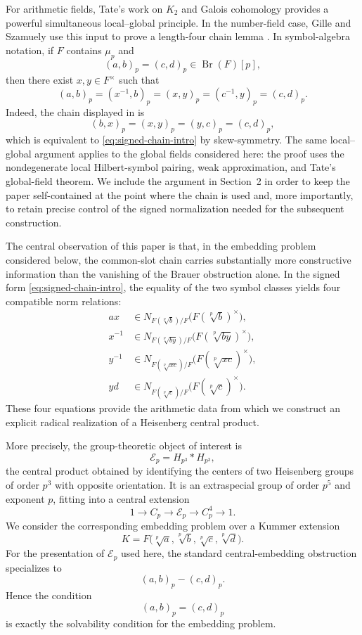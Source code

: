 \documentclass[12pt]{amsart}
\theoremstyle{definition}
\theoremstyle{remark}
\DeclareMathOperator{\Br}{Br}
\newcommand{\Hp}{H_{p^3}}
\newcommand{\E}{\mathcal E_p}
\begin{document}
For arithmetic fields, Tate's work on $K_2$ and Galois cohomology provides a
powerful simultaneous local--global principle. In the number-field case,
Gille and Szamuely use this input to prove a length-four chain lemma
\cite[Lemma~7.6.11]{GilleSzamuely}. In symbol-algebra notation, if $F$
contains $\mu_p$ and
\[(a,b)_p=(c,d)_p\in\Br(F)[p],\]
then there exist $x,y\in F^\times$ such that
\begin{equation}\label{eq:signed-chain-intro}
	(a,b)_p=(x^{-1},b)_p=(x,y)_p=(c^{-1},y)_p=(c,d)_p.
\end{equation}
Indeed, the chain displayed in \cite[Lemma~7.6.11]{GilleSzamuely} is
\[(b,x)_p=(x,y)_p=(y,c)_p=(c,d)_p,\]
which is equivalent to \eqref{eq:signed-chain-intro} by skew-symmetry. The
same local--global argument applies to the global fields considered here:
the proof uses the nondegenerate local Hilbert-symbol pairing, weak
approximation, and Tate's global-field theorem. We include the argument in
Section~2 in order to keep the paper self-contained at the point where the
chain is used and, more importantly, to retain precise control of the signed
normalization needed for the subsequent construction.

The central observation of this paper is that, in the embedding problem
considered below, the common-slot chain carries substantially more
constructive information than the vanishing of the Brauer obstruction alone.
In the signed form \eqref{eq:signed-chain-intro}, the equality of the two
symbol classes yields four compatible norm relations:
\begin{align*}
	ax &\in N_{F(\sqrt[p]{b})/F}\bigl(F(\sqrt[p]{b})^\times\bigr),\\
	x^{-1} &\in N_{F(\sqrt[p]{by})/F}\bigl(F(\sqrt[p]{by})^\times\bigr),\\
	y^{-1} &\in N_{F(\sqrt[p]{xc})/F}\bigl(F(\sqrt[p]{xc})^\times\bigr),\\
	yd &\in N_{F(\sqrt[p]{c})/F}\bigl(F(\sqrt[p]{c})^\times\bigr).
\end{align*}
These four equations provide the arithmetic data from which we construct an
explicit radical realization of a Heisenberg central product.

More precisely, the group-theoretic object of interest is
\[\E=\Hp*\Hp,\]
the central product obtained by identifying the centers of two Heisenberg
groups of order $p^3$ with opposite orientation. It is an extraspecial group
of order $p^5$ and exponent $p$, fitting into a central extension
\[1\longrightarrow C_p\longrightarrow\E\longrightarrow C_p^4
\longrightarrow1.\]
We consider the corresponding embedding problem over a Kummer extension
\[K=F\bigl(\sqrt[p]{a},\sqrt[p]{b},\sqrt[p]{c},\sqrt[p]{d}\bigr).\]
For the presentation of $\E$ used here, the standard central-embedding
obstruction specializes to
\[(a,b)_p-(c,d)_p.\]
Hence the condition
\[(a,b)_p=(c,d)_p\]
is exactly the solvability condition for the embedding problem.
\end{document}
